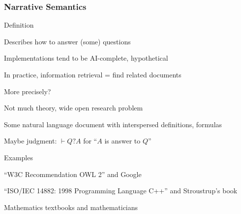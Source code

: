 \begin{frame}\frametitle{Narrative Semantics}
\begin{blockitems}{Definition}
\item Describes how to answer (some) questions
\item Implementations tend to be AI-complete, hypothetical
\item In practice, information retrieval = find related documents
\end{blockitems}

\begin{blockitems}{More precisely?}
\item Not much theory, wide open research problem
\item Some natural language document with interspersed definitions, formulas
\item Maybe judgment: $\vdash Q ? A$ for ``$A$ is answer to $Q$''
\end{blockitems}

\begin{blockitems}{Examples}
\item ``W3C Recommendation OWL 2'' and Google
\item ``ISO/IEC 14882: 1998 Programming Language C++'' and Stroustrup's book
\item Mathematics textbooks and mathematicians
\end{blockitems}
\end{frame}

%

